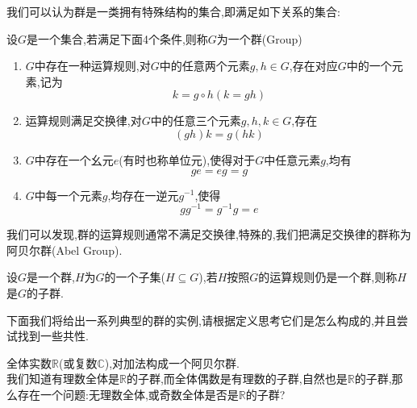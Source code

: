 我们可以认为群是一类拥有特殊结构的集合,即满足如下关系的集合:
\begin{definition}[群的定义]
    设$G$是一个集合,若满足下面4个条件,则称$G$为一个群(Group)
    \begin{enumerate}
        \item $G$中存在一种运算规则,对$G$中的任意两个元素$g,h\in G$,存在对应$G$中的一个元素,记为
        \begin{equation}
            k=g\circ h(k=gh)
        \end{equation}
        \item 运算规则满足交换律,对$G$中的任意三个元素$g,h,k\in G$,存在
        \begin{equation}
            (gh)k=g(hk)
        \end{equation}
        \item $G$中存在一个幺元$e$(有时也称单位元),使得对于$G$中任意元素$g$,均有
        \begin{equation}
            ge=eg=g
        \end{equation}
        \item $G$中每一个元素$g$,均存在一逆元$g^{-1}$,使得
        \begin{equation}
            gg^{-1}=g^{-1}g=e
        \end{equation}
    \end{enumerate}
\end{definition}
我们可以发现,群的运算规则通常不满足交换律,特殊的,我们把满足交换律的群称为阿贝尔群(Abel Group).
\begin{definition}[子群的定义]
    设$G$是一个群,$H$为$G$的一个子集($H\subseteq G$),若$H$按照$G$的运算规则仍是一个群,则称$H$是$G$的子群.
\end{definition}
下面我们将给出一系列典型的群的实例,请根据定义思考它们是怎么构成的,并且尝试找到一些共性.
\begin{example}
    全体实数$\mathbb{R}$(或复数$\mathbb{C}$),对加法构成一个阿贝尔群.\\
    我们知道有理数全体是$\mathbb{R}$的子群,而全体偶数是有理数的子群,自然也是$\mathbb{R}$的子群,那么存在一个问题:无理数全体,或奇数全体是否是$\mathbb{R}$的子群?
\end{example}
